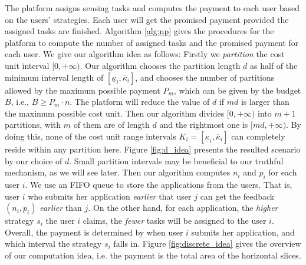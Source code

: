 \documentclass[conference]{IEEEtran}
\theoremstyle{definition}
\begin{document}
The platform assigns sensing tasks and computes the payment to each user based on the users' strategies. Each user will get the promised payment provided the assigned tasks are finished. Algorithm \ref{alg:np} gives the procedures for the platform to compute the number of assigned tasks and the promised payment for each user. 
{\color{black}We give our algorithm idea as follows:
\relax
\bolditem Firstly we {\it partition} the cost unit interval $[0, +\infty)$. Our algorithm chooses the partition length $d$ as half of the minimum interval length of $[\underline{\kappa}_i, \overline{\kappa}_i]$, and chooses the number of partitions allowed by the maximum possible payment $P_m$, {\color{blue}which can be given by the budget $B$, i.e., $B\geq P_m\cdot n$}. The platform will reduce the value of $d$ if $md$ is larger than the maximum possible cost unit. Then our algorithm divides $[0, +\infty)$ into $m+1$ partitions, with $m$ of them are of length $d$ and the rightmost one is $[md, +\infty)$. By doing this, none of the cost unit range intervals $K_i=[\underline{\kappa}_i, \overline{\kappa}_i]$ can completely reside within any partition here. Figure \ref{fig:d_idea} presents the resulted scenario by our choice of $d$. Small partition intervals may be beneficial to our truthful mechanism, as we will see later. 
\bolditem Then our algorithm computes $n_i$ and $p_i$ for each user $i$. {\color{blue}We use an FIFO queue to store the applications from the users. That is, user $i$ who submits her application \emph{earlier} that user $j$ can get the feedback $(n_i, p_i)$ \emph{earlier} than $j$. On the other hand, for each application, the {\it higher} strategy $s_i$ the user $i$ claims, the {\it fewer} tasks will be assigned to the user $i$. Overall, the payment is determined by when user $i$ submits her application, and which interval the strategy $s_i$ falls in.} Figure \ref{fig:discrete_idea} gives the overview of our computation idea, i.e. the payment is the total area of the horizontal slices.
}
\end{document}
